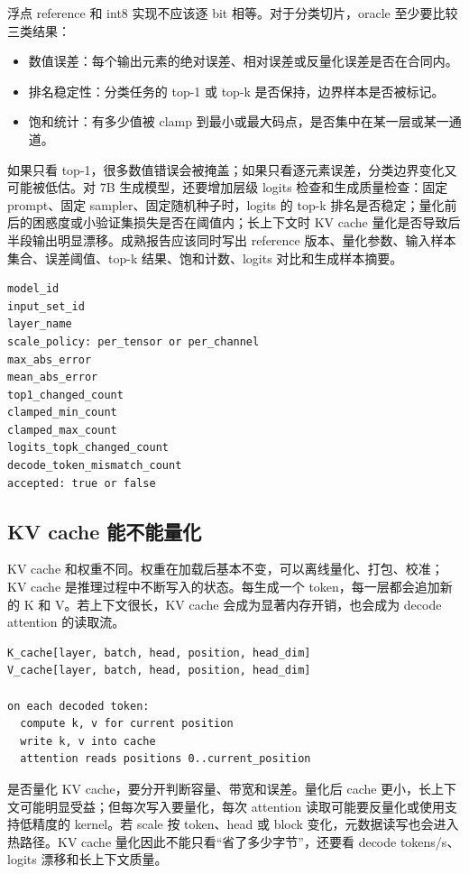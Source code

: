 浮点 reference 和 int8 实现不应该逐 bit 相等。对于分类切片，oracle 至少要比较三类结果：

\begin{itemize}
  \item 数值误差：每个输出元素的绝对误差、相对误差或反量化误差是否在合同内。
  \item 排名稳定性：分类任务的 top-1 或 top-k 是否保持，边界样本是否被标记。
  \item 饱和统计：有多少值被 clamp 到最小或最大码点，是否集中在某一层或某一通道。
\end{itemize}

如果只看 top-1，很多数值错误会被掩盖；如果只看逐元素误差，分类边界变化又可能被低估。对 7B 生成模型，还要增加层级 logits 检查和生成质量检查：固定 prompt、固定 sampler、固定随机种子时，logits 的 top-k 排名是否稳定；量化前后的困惑度或小验证集损失是否在阈值内；长上下文时 KV cache 量化是否导致后半段输出明显漂移。成熟报告应该同时写出 reference 版本、量化参数、输入样本集合、误差阈值、top-k 结果、饱和计数、logits 对比和生成样本摘要。

\begin{lstlisting}[numbers=none,caption={量化误差报告的最小字段}]
model_id
input_set_id
layer_name
scale_policy: per_tensor or per_channel
max_abs_error
mean_abs_error
top1_changed_count
clamped_min_count
clamped_max_count
logits_topk_changed_count
decode_token_mismatch_count
accepted: true or false
\end{lstlisting}

\subsection{KV cache 能不能量化}

KV cache 和权重不同。权重在加载后基本不变，可以离线量化、打包、校准；KV cache 是推理过程中不断写入的状态。每生成一个 token，每一层都会追加新的 K 和 V。若上下文很长，KV cache 会成为显著内存开销，也会成为 decode attention 的读取流。

\begin{lstlisting}[numbers=none,caption={KV cache 的状态账本}]
K_cache[layer, batch, head, position, head_dim]
V_cache[layer, batch, head, position, head_dim]

on each decoded token:
  compute k, v for current position
  write k, v into cache
  attention reads positions 0..current_position
\end{lstlisting}

是否量化 KV cache，要分开判断容量、带宽和误差。量化后 cache 更小，长上下文可能明显受益；但每次写入要量化，每次 attention 读取可能要反量化或使用支持低精度的 kernel。若 scale 按 token、head 或 block 变化，元数据读写也会进入热路径。KV cache 量化因此不能只看“省了多少字节”，还要看 decode tokens/s、logits 漂移和长上下文质量。

